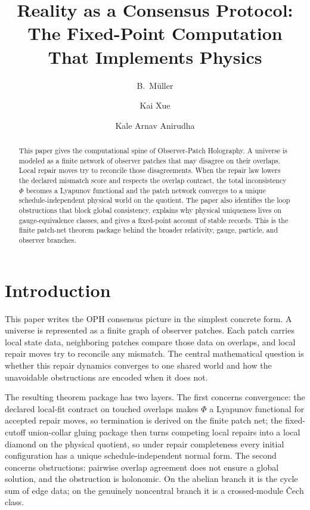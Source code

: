 \documentclass[11pt]{article}
\title{Reality as a Consensus Protocol:\\
The Fixed-Point Computation That Implements Physics}
\author{B.\ M\"uller \and Kai Xue \and Kale Arnav Anirudha}
\date{\OPHPaperReleaseDate}
\theoremstyle{remark}
\theoremstyle{plain}
\begin{document}
\maketitle
\OPHPaperReleaseBanner

\begin{abstract}
This paper gives the computational spine of Observer-Patch Holography. A universe is modeled as a finite network of observer patches that may disagree on their overlaps. Local repair moves try to reconcile those disagreements. When the repair law lowers the declared mismatch score and respects the overlap contract, the total inconsistency \(\Phi\) becomes a Lyapunov functional and the patch network converges to a unique schedule-independent physical world on the quotient. The paper also identifies the loop obstructions that block global consistency, explains why physical uniqueness lives on gauge-equivalence classes, and gives a fixed-point account of stable records. This is the finite patch-net theorem package behind the broader relativity, gauge, particle, and observer branches.
\end{abstract}

\section{Introduction}

This paper writes the OPH consensus picture in the simplest concrete form. A universe is represented as a finite graph of observer patches. Each patch carries local state data, neighboring patches compare those data on overlaps, and local repair moves try to reconcile any mismatch. The central mathematical question is whether this repair dynamics converges to one shared world and how the unavoidable obstructions are encoded when it does not.

The resulting theorem package has two layers. The first concerns convergence: the declared
local-fit contract on touched overlaps makes \(\Phi\) a Lyapunov functional for accepted repair
moves, so termination is derived on the finite patch net; the fixed-cutoff union-collar gluing
package then turns competing local repairs into a local diamond on the physical quotient, so
under repair completeness every initial configuration has a unique schedule-independent normal
form. The second concerns obstructions: pairwise overlap agreement does not ensure a
global solution, and the obstruction is holonomic. On the abelian branch it is the cycle sum of
edge data; on the genuinely noncentral branch it is a crossed-module \v{C}ech class.
\end{document}
